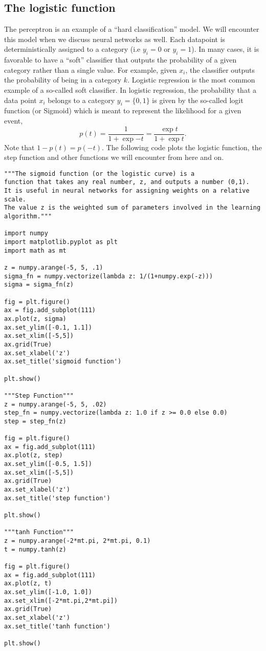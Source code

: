 \documentclass[%
oneside,                 %
final,                   %
10pt]{article}
\begin{document}
\subsection*{The logistic function}

The perceptron is an example of a ``hard classification'' model. We
will encounter this model when we discuss neural networks as
well. Each datapoint is deterministically assigned to a category (i.e
$y_i=0$ or $y_i=1$). In many cases, it is favorable to have a ``soft''
classifier that outputs the probability of a given category rather
than a single value. For example, given $x_i$, the classifier
outputs the probability of being in a category $k$.  Logistic regression
is the most common example of a so-called soft classifier. In logistic
regression, the probability that a data point $x_i$
belongs to a category $y_i=\{0,1\}$ is given by the so-called logit function (or Sigmoid) which is meant to represent the likelihood for a given event, 
\[
p(t) = \frac{1}{1+\mathrm \exp{-t}}=\frac{\exp{t}}{1+\mathrm \exp{t}}.
\]
Note that $1-p(t)= p(-t)$.
The following code plots the logistic function, the step function and other functions we will encounter from here and on.


\begin{verbatim}
"""The sigmoid function (or the logistic curve) is a
function that takes any real number, z, and outputs a number (0,1).
It is useful in neural networks for assigning weights on a relative scale.
The value z is the weighted sum of parameters involved in the learning algorithm."""

import numpy
import matplotlib.pyplot as plt
import math as mt

z = numpy.arange(-5, 5, .1)
sigma_fn = numpy.vectorize(lambda z: 1/(1+numpy.exp(-z)))
sigma = sigma_fn(z)

fig = plt.figure()
ax = fig.add_subplot(111)
ax.plot(z, sigma)
ax.set_ylim([-0.1, 1.1])
ax.set_xlim([-5,5])
ax.grid(True)
ax.set_xlabel('z')
ax.set_title('sigmoid function')

plt.show()

"""Step Function"""
z = numpy.arange(-5, 5, .02)
step_fn = numpy.vectorize(lambda z: 1.0 if z >= 0.0 else 0.0)
step = step_fn(z)

fig = plt.figure()
ax = fig.add_subplot(111)
ax.plot(z, step)
ax.set_ylim([-0.5, 1.5])
ax.set_xlim([-5,5])
ax.grid(True)
ax.set_xlabel('z')
ax.set_title('step function')

plt.show()

"""tanh Function"""
z = numpy.arange(-2*mt.pi, 2*mt.pi, 0.1)
t = numpy.tanh(z)

fig = plt.figure()
ax = fig.add_subplot(111)
ax.plot(z, t)
ax.set_ylim([-1.0, 1.0])
ax.set_xlim([-2*mt.pi,2*mt.pi])
ax.grid(True)
ax.set_xlabel('z')
ax.set_title('tanh function')

plt.show()
\end{verbatim}
\end{document}

